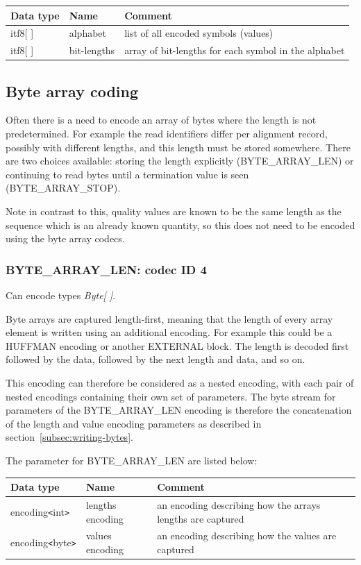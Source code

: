 \documentclass[a4paper]{article}
\begin{document}
\begin{tabular}{|>{\raggedright}p{100pt}|>{\raggedright}p{100pt}|>{\raggedright}p{230pt}|}
\hline
\textbf{Data type} & \textbf{Name} & \textbf{Comment}
\tabularnewline
\hline
itf8[ ] & alphabet & list of all encoded symbols (values)\tabularnewline
\hline
itf8[ ] & bit-lengths & array of bit-lengths for each symbol in the alphabet\tabularnewline
\hline
\end{tabular}

\subsection{Byte array coding}

Often there is a need to encode an array of bytes where the length is not predetermined.
For example the read identifiers differ per alignment record, possibly with different lengths, and this length must be stored somewhere.
There are two choices available: storing the length explicitly (BYTE\_ARRAY\_LEN) or continuing to read bytes until a termination value is seen (BYTE\_ARRAY\_STOP).

Note in contrast to this, quality values are known to be the same length as the sequence which is an already known quantity, so this does not need to be encoded using the byte array codecs.

\subsubsection*{BYTE\_ARRAY\_LEN: codec ID 4}

Can encode types \textit{Byte[ ]}.

Byte arrays are captured length-first, meaning that the length of every array element is written using an additional encoding.
For example this could be a HUFFMAN encoding or another EXTERNAL block.
The length is decoded first followed by the data, followed by the next length and data, and so on.

This encoding can therefore be considered as a nested encoding, with each pair of nested encodings containing their own set of parameters.
The byte stream for parameters of the BYTE\_ARRAY\_LEN encoding is therefore the concatenation of the length and value encoding parameters as described in section~\ref{subsec:writing-bytes}.

The parameter for BYTE\_ARRAY\_LEN are listed below:

\begin{tabular}{|>{\raggedright}p{100pt}|>{\raggedright}p{100pt}|>{\raggedright}p{230pt}|}
\hline
\textbf{Data type} & \textbf{Name} & \textbf{Comment}
\tabularnewline
\hline
encoding\texttt{<}int\texttt{>} & lengths encoding & an encoding describing how 
the arrays lengths are captured\tabularnewline
\hline
encoding\texttt{<}byte\texttt{>} & values encoding & an encoding describing how 
the values are captured\tabularnewline
\hline
\end{tabular}
\end{document}
